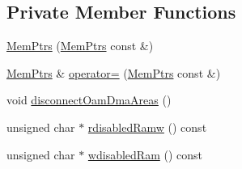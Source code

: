 \subsection*{Private Member Functions}
\begin{DoxyCompactItemize}
\item 
\hyperlink{classgambatte_1_1MemPtrs_ae3d20b44cc53c66f1a7d002d70199e7e}{Mem\+Ptrs} (\hyperlink{classgambatte_1_1MemPtrs}{Mem\+Ptrs} const \&)
\item 
\hyperlink{classgambatte_1_1MemPtrs}{Mem\+Ptrs} \& \hyperlink{classgambatte_1_1MemPtrs_aae54b80162586cb26f31d904cd9e3bcc}{operator=} (\hyperlink{classgambatte_1_1MemPtrs}{Mem\+Ptrs} const \&)
\item 
void \hyperlink{classgambatte_1_1MemPtrs_a5252899528351e3b65b4dbd0ab602cd4}{disconnect\+Oam\+Dma\+Areas} ()
\item 
unsigned char $\ast$ \hyperlink{classgambatte_1_1MemPtrs_a838e62acc2f6aefdacebb30ff2bcfbba}{rdisabled\+Ramw} () const
\item 
unsigned char $\ast$ \hyperlink{classgambatte_1_1MemPtrs_a2d5b20be9cc367f4350b951cc28673d8}{wdisabled\+Ram} () const
\end{DoxyCompactItemize}
